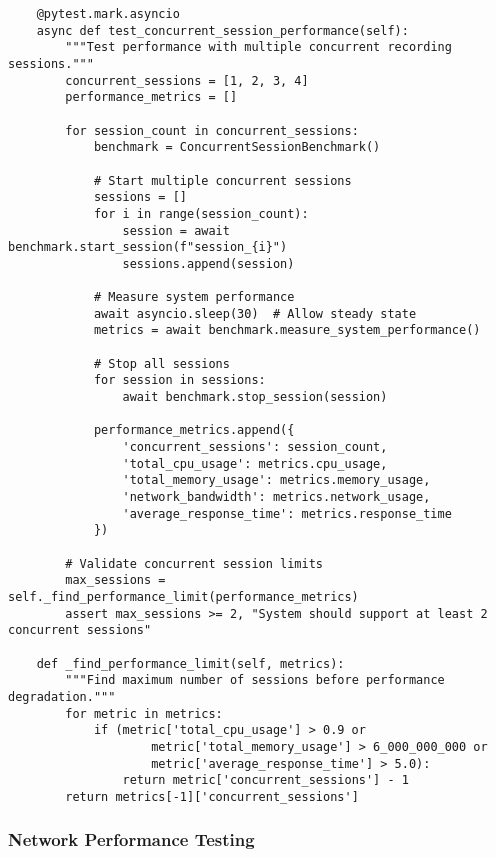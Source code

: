 \documentclass[11pt,a4paper]{report}
\begin{document}
\begin{verbatim}
    @pytest.mark.asyncio
    async def test_concurrent_session_performance(self):
        """Test performance with multiple concurrent recording sessions."""
        concurrent_sessions = [1, 2, 3, 4]
        performance_metrics = []

        for session_count in concurrent_sessions:
            benchmark = ConcurrentSessionBenchmark()

            # Start multiple concurrent sessions
            sessions = []
            for i in range(session_count):
                session = await benchmark.start_session(f"session_{i}")
                sessions.append(session)

            # Measure system performance
            await asyncio.sleep(30)  # Allow steady state
            metrics = await benchmark.measure_system_performance()

            # Stop all sessions
            for session in sessions:
                await benchmark.stop_session(session)

            performance_metrics.append({
                'concurrent_sessions': session_count,
                'total_cpu_usage': metrics.cpu_usage,
                'total_memory_usage': metrics.memory_usage,
                'network_bandwidth': metrics.network_usage,
                'average_response_time': metrics.response_time
            })

        # Validate concurrent session limits
        max_sessions = self._find_performance_limit(performance_metrics)
        assert max_sessions >= 2, "System should support at least 2 concurrent sessions"

    def _find_performance_limit(self, metrics):
        """Find maximum number of sessions before performance degradation."""
        for metric in metrics:
            if (metric['total_cpu_usage'] > 0.9 or
                    metric['total_memory_usage'] > 6_000_000_000 or
                    metric['average_response_time'] > 5.0):
                return metric['concurrent_sessions'] - 1
        return metrics[-1]['concurrent_sessions']
\end{verbatim}

\subsubsection{Network Performance Testing}
\end{document}
